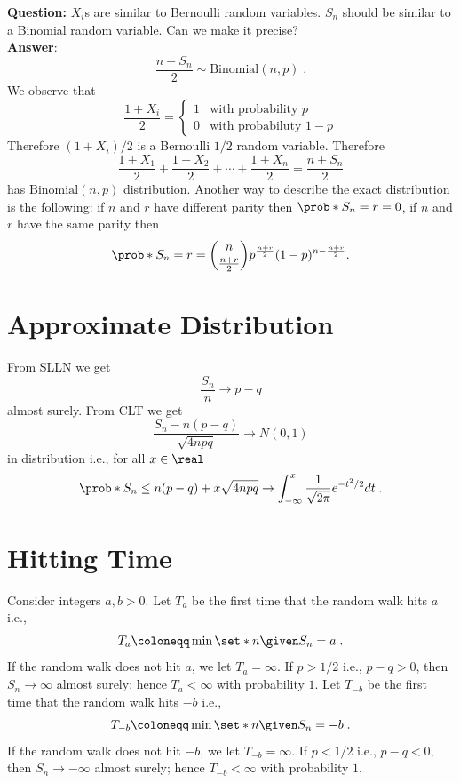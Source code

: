 \textbf{Question:} $X_i$s are similar to Bernoulli random variables. $S_n$ should be similar to a Binomial random variable. Can we make it precise?\\
\noindent\textbf{Answer}: 
\begin{equation}
\frac{n+S_n}{2}\sim\mathrm{Binomial}(n,p)\;.
\end{equation}
We observe that
\begin{equation}
\frac{1+X_i}{2}=
\begin{cases}
1 & \mbox{with probability } p\\
0 & \mbox{with probabiluty } 1-p
\end{cases}
\end{equation}
Therefore $(1+X_i)/2$ is a Bernoulli $1/2$ random variable. Therefore
\begin{equation}
\frac{1+X_1}{2} + 
\frac{1+X_2}{2} +
\cdots +
\frac{1+X_n}{2}
=\frac{n+S_n}{2}
\end{equation}
has $\mathrm{Binomial}(n,p)$ distribution. Another way to describe the exact distribution is the following: if $n$ and $r$ have different parity then $\prob*{S_n=r}=0$, if $n$ and $r$ have the same parity then 
\[
\prob*{S_n=r} = \binom{n}{\frac{n+r}{2}}p^{\frac{n+r}{2}}(1-p)^{n-\frac{n+r}{2}}.
\]

\section{Approximate Distribution}

From SLLN we get
\begin{equation}
\frac{S_n}{n}\to p-q
\end{equation}
almost surely. From CLT we get
\begin{equation}
\frac{S_n-n(p-q)}{\sqrt{4npq}}\to N(0,1)
\end{equation}
in distribution i.e., for all $x\in\real$
\begin{equation}
\prob*{S_n\leq n(p-q)+x\sqrt{4npq}}\to\int_{-\infty}^x
\frac{1}{\sqrt{2\pi}}e^{-t^2/2}dt\;.
\end{equation}

\section{Hitting Time}

Consider integers $a,b>0$. Let $T_a$ be the first time that the random walk hits $a$ i.e.,
\[
T_a \coloneqq \min\set*{ n \given S_n = a}\;.
\]
If the random walk does not hit $a$, 
we let $T_a=\infty$. If $p>1/2$ i.e., $p-q>0$, then $S_n\to\infty$ almost surely; hence $T_a<\infty$ with probability $1$. Let $T_{-b}$ be the first time that the random walk hits $-b$ i.e.,
\[
T_{-b} \coloneqq \min\set*{ n \given S_n = -b}\;.
\]
If the random walk does not hit $-b$, we let $T_{-b}=\infty$. If $p<1/2$ i.e., $p-q<0$, then $S_n\to-\infty$ almost surely; hence $T_{-b}<\infty$ with probability $1$.


